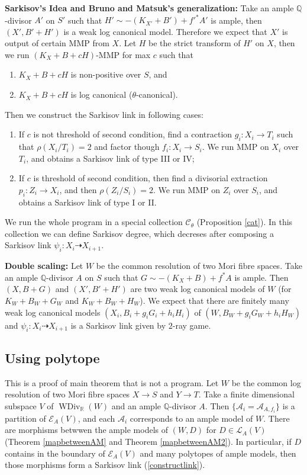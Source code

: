 \documentclass[11pt]{amsart}
\numberwithin{equation}{section}
\begin{document}
\textbf{Sarkisov's Idea and Bruno and Matsuk's generalization:} Take an ample $\mathbb{Q}$-divisor $A'$ on $S'$ such that $H'\sim -(K_{X'}+B') +f'^*A'$  is ample, then $(X',B'+H')$ is a weak log canonical model. Therefore we expect that $X'$ is output of certain MMP from $X$. Let $H$ be the strict transform of $H'$ on $X$, then we run $(K_{X}+B+cH)$-MMP for max  $c$ such that
\begin{enumerate}
  \item $K_{X}+B+cH$ is non-positive over $S$, and 
  \item $K_{X}+B+cH$ is log canonical ($\theta$-canonical).
\end{enumerate}
Then we construct the Sarkisov link in following cases:
\begin{enumerate}
  \item If $c$ is not threshold of second condition, find a contraction $g_{i}:X_{i} \to T_{i}$ such that $\rho(X_{i}/T_{i})=2$ and factor though $f_{i}:X_{i} \to S_{i}$.  We run MMP on  $X_{i} $ over $T_{i}$, and obtains a Sarkisov link of type III or IV;
  \item If $c$ is threshold of second condition, then find a divisorial extraction $p_{i}:Z_{i}\to X_{i}$, and then $\rho(Z_{i}/S_{i})=2$.  We run MMP on $Z_{i}$ over $S_{i}$, and obtains a Sarkisov link of type I or II. 
\end{enumerate}
We run the whole program in a special collection $\mathcal{C}_{\theta}$ (Proposition \ref{cat}). In this collection we can define Sarkisov degree, which decreses after composing a Sarkisov link $\psi_{i}:X_{i}\dashrightarrow X_{i+1}$.

\textbf{Double scaling:} Let $W$ be the common resolution of two Mori fibre spaces. Take an ample $\mathbb{Q}$-divisor $A$ on $S$ such that $G\sim -(K_{X}+B) +f^*A$  is ample. Then  $(X,B+G)$ and $(X',B'+H')$ are two weak log canonical models of $W$ (for $K_{W}+B_{W}+G_{W}$ and $K_{W}+B_{W}+H_{W}$). We expect that there are finitely many weak log canonical models $(X_{i},B_{i}+g_{i}G_{i}+h_{i}H_{i})$ of $(W,B_{W}+g_{i}G_{W}+h_{i}H_{W})$ and $\psi_{i}:X_{i}\dashrightarrow X_{i+1}$ is a Sarkisov link given by $2$-ray game.

\subsection{Using polytope}
This is a proof of main theorem that is not a program. Let $W$ be the common log resolution of two Mori fibre spaces $X\to S$ and $Y\to T$. Take a finite dimensional subspace $V$ of $\operatorname{WDiv}_{\mathbb{R}}(W)$ and an ample $\mathbb{Q}$-divisor $A$. Then $\{\mathcal{A}_{i} =\mathcal{A}_{A,f_{i}}\} $ is a partition of $\mathcal{E}_{A}(V)$, and each $\mathcal{A}_{i}$ corresponds to an ample model of $W$. There are morphisms betwwen the ample models of $(W,D)$ for $D \in \mathcal{L}_{A}(V)$ (Theorem \ref{mapbetweenAM} and Theorem \ref{mapbetweenAM2}). In particular, if $D$ contains in the boundary of  $\mathcal{E}_{A}(V)$ and many polytopes of ample models, then those morphisms form a Sarkisov link (\ref{constructlink}).
\end{document}
